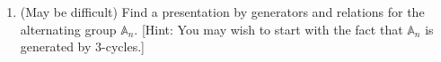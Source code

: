 \documentclass[11pt,oneside]{article}
\newenvironment{problems}
{
 \begin{enumerate}[topsep=1pt,itemsep=0pt,parsep=2pt,leftmargin=0.6cm,%
 label={\arabic*.}, ref=\arabic*] \small
}
{
 \end{enumerate}
}
\theoremstyle{definition}
\newcommand{\Sym}{\mathbb{S}}
\newcommand{\Alt}{\mathbb{A}}
\begin{document}
\begin{problems}
\begin{enumerate}
  \item (May be difficult) Find a set of defining relations on these
    generators that gives a presentation of $\Sym_n$ by these two
    generators and the relations you found.
\end{enumerate}

\item (May be difficult) Find a presentation by generators and
  relations for the alternating group $\Alt_n$. [Hint: You may wish to
    start with the fact that $\Alt_n$ is generated by 3-cycles.]


\end{problems}
\end{document}
